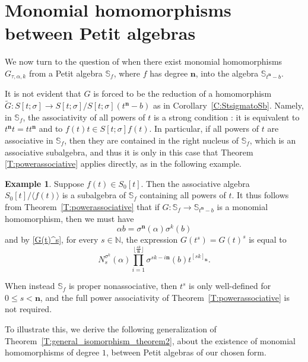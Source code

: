 \documentclass[11pt]{amsart}
\theoremstyle{plain}
\theoremstyle{definition}
\newtheorem{example}[theorem]{Example}
\numberwithin{equation}{section}
\numberwithin{figure}{section}
\newcommand{\Sf}{\Stsigma/\Stsigma f(t)} %
\newcommand{\Sone}[1]{\Stsigma/\Stsigma (t^{\de}-#1)} %
\newcommand{\ring}{S}
\newcommand{\Stsigma}{S[t;\sigma]}
\newcommand{\de}{\mathbf{n}}  %
\begin{document}
\section{Monomial homomorphisms between Petit algebras} \label{S:4}


We now turn to the question of when there exist monomial homomorphisms $G_{\tau,\alpha,k}$ from a Petit algebra $\mathbb{S}_{f}$,
where $f$ has degree $\de$, into the algebra $\mathbb{S}_{t^\de-b}$. 

 It is not evident that $G$ is forced to be the reduction of a homomorphism $\tilde{G}:\Stsigma \to \Sone{b}$ as in Corollary~\ref{C:StsigmatoSb}.
Namely, in  $\mathbb{S}_{f}$, 
the associativity of all powers of $t$ is a strong condition \cite[p.~13-06]{Petit1967}: it is equivalent to $t^{\de} t=t t^{\de}$ and to $f(t) t \in \Stsigma f(t)$.  In particular, if all powers of $t$ are associative in  $\mathbb{S}_{f}$,
then they are contained in the right nucleus of $\mathbb{S}_{f}$,   %
which is an associative subalgebra, and thus it is only in this case that Theorem \ref{T:powerassociative} applies directly, as in the following example.

\begin{example}
    Suppose $f(t)\in \ring_0[t]$.  Then the associative algebra $\ring_0[t]/\langle f(t)\rangle$ is a subalgebra of $\mathbb{S}_{f}$ %
    containing all powers of $t$. It thus follows from  Theorem~\ref{T:powerassociative} that if $G:\mathbb{S}_{f}\to \mathbb{S}_{t^\de -b}$
    is a monomial homomorphism,
    then we must have
    $$
\alpha b = \sigma^{\de}(\alpha) \sigma^k(b)
$$
and by \eqref{G(t)^s}, for  every $s\in \mathbb{N}$, the expression $G(t^s)=G(t)^s$ is equal to
\begin{equation}\label{G(t)^sextra}
    N_{s}^{\sigma^k}(\alpha)\prod_{i=1}^{\lfloor \frac{sk}{\de}\rfloor} \sigma^{sk-i\de}(b)t^{[sk]_{\de}}.
\end{equation}
\end{example}



When instead $\mathbb{S}_{f}$ %
is proper nonassociative, then  $t^s$ is only well-defined for $0\leq s <\de$, and the full power associativity of Theorem~\ref{T:powerassociative} is not required.

To illustrate this, we derive the following generalization of Theorem~\ref{T:general_isomorphism_theorem2}, about the existence of monomial homomorphisms of degree $1$, between Petit algebras of our chosen form.
\end{document}
